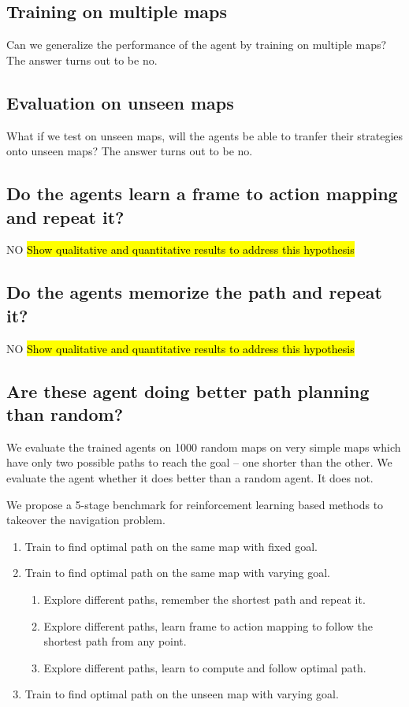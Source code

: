 \subsection{Training on multiple maps}
Can we generalize the performance of the agent by training on multiple maps? The answer turns out to be no.

\subsection{Evaluation on unseen maps}
What if we test on unseen maps, will the agents be able to tranfer their strategies onto unseen maps? The answer turns out to be no.

\subsection{Do the agents learn a frame to action mapping and repeat it?}
NO
\hl{Show qualitative and quantitative results to address this hypothesis}

\subsection{Do the agents memorize the path and repeat it?}
NO
\hl{Show qualitative and quantitative results to address this hypothesis}

\subsection{Are these agent doing better path planning than random?}
We evaluate the trained agents on 1000 random maps on very simple maps which have only two possible paths to reach the goal -- one shorter than the other. We evaluate the agent whether it does better than a random agent.
It does not.

We propose a 5-stage benchmark for reinforcement learning based methods to takeover the navigation problem.
\begin{enumerate}
  \item Train to find optimal path on the same map with fixed goal.
  \item Train to find optimal path on the same map with varying goal. 
    \begin{enumerate}
    \item Explore different paths, remember the shortest path and repeat it.
    \item Explore different paths, learn frame to action mapping to follow the shortest path from any point.
      \item Explore different paths, learn to compute and follow optimal path.
    \end{enumerate}
  \item Train to find optimal path on the unseen map with varying goal. 
\end{enumerate}



